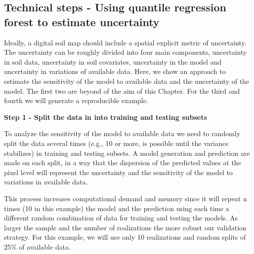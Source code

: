 \documentclass[10pt,b5paper,]{book}
\theoremstyle{definition}
\theoremstyle{definition}
\theoremstyle{definition}
\theoremstyle{remark}
\begin{document}
\hypertarget{technical-steps---using-quantile-regression-forest-to-estimate-uncertainty}{%
\subsection{Technical steps - Using quantile regression forest to
estimate
uncertainty}\label{technical-steps---using-quantile-regression-forest-to-estimate-uncertainty}}

Ideally, a digital soil map should include a spatial explicit metric of
uncertainty. The uncertainty can be roughly divided into four main
components, uncertainty in soil data, uncertainty in soil covariates,
uncertainty in the model and uncertainty in variations of available
data. Here, we show an approach to estimate the sensitivity of the model
to available data and the uncertainty of the model. The first two are
beyond of the aim of this Chapter. For the third and fourth we will
generate a reproducible example.

\textbf{Step 1 - Split the data in into training and testing subsets}

To analyze the sensitivity of the model to available data we need to
randomly split the data several times (e.g., 10 or more, is possible
until the variance stabilizes) in training and testing subsets. A model
generation and prediction are made on each split, in a way that the
dispersion of the predicted values at the pixel level will represent the
uncertainty and the sensitivity of the model to variations in available
data.

This process increases computational demand and memory since it will
repeat n times (10 in this example) the model and the prediction using
each time a different random combination of data for training and
testing the models. As larger the sample and the number of realizations
the more robust our validation strategy. For this example, we will use
only 10 realizations and random splits of 25\% of available data.
\end{document}
